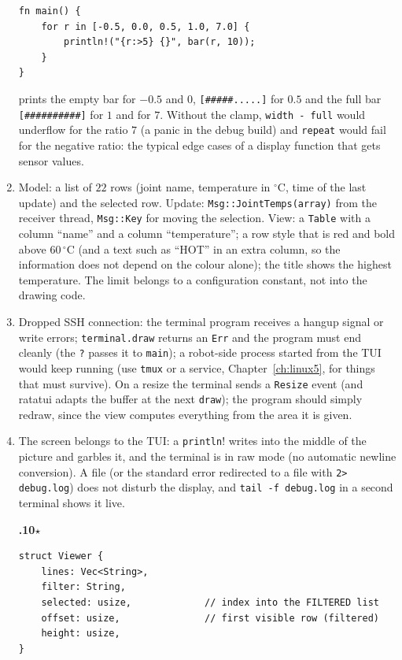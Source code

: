 \begin{enumerate}[label=\textbf{\ansnum.\arabic*}]
\begin{verbatim}
fn main() {
    for r in [-0.5, 0.0, 0.5, 1.0, 7.0] {
        println!("{r:>5} {}", bar(r, 10));
    }
}
\end{verbatim}
prints the empty bar for $-0.5$ and $0$, \verb![#####.....]! for $0.5$ and the full bar \verb![##########]! for $1$ and for $7$. Without the clamp, \verb!width - full! would underflow for the ratio $7$ (a panic in the debug build) and \verb!repeat! would fail for the negative ratio: the typical edge cases of a display function that gets sensor values.
  \item Model: a list of $22$ rows (joint name, temperature in $^\circ$C, time of the last update) and the selected row. Update: \verb!Msg::JointTemps(array)! from the receiver thread, \verb!Msg::Key! for moving the selection. View: a \verb!Table! with a column ``name'' and a column ``temperature''; a row style that is red and bold above $60\,^\circ$C (and a text such as ``HOT'' in an extra column, so the information does not depend on the colour alone); the title shows the highest temperature. The limit belongs to a configuration constant, not into the drawing code.
  \item Dropped SSH connection: the terminal program receives a hangup signal or write errors; \verb!terminal.draw! returns an \verb!Err! and the program must end cleanly (the \verb!?! passes it to \verb!main!); a robot-side process started from the TUI would keep running (use \verb!tmux! or a service, Chapter~\ref{ch:linux5}, for things that must survive). On a resize the terminal sends a \verb!Resize! event (and ratatui adapts the buffer at the next \verb!draw!); the program should simply redraw, since the view computes everything from the area it is given.
  \item The screen belongs to the TUI: a \verb!println!! writes into the middle of the picture and garbles it, and the terminal is in raw mode (no automatic newline conversion). A file (or the standard error redirected to a file with \verb!2> debug.log!) does not disturb the display, and \verb!tail -f debug.log! in a second terminal shows it live.
  \item[\textbf{\ansnum.10}$\star$]
\begin{verbatim}
struct Viewer {
    lines: Vec<String>,
    filter: String,
    selected: usize,             // index into the FILTERED list
    offset: usize,               // first visible row (filtered)
    height: usize,
}


\end{verbatim}
\end{enumerate}
